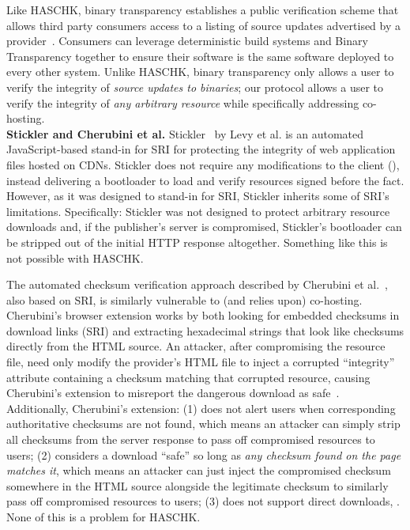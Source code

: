Like HASCHK, binary transparency establishes a public verification scheme
that allows third party consumers access to a listing of source updates
advertised by a provider~\cite{BinaryTransparency}. Consumers can leverage
deterministic build systems and Binary Transparency together to ensure their
software is the same software deployed to every other system. Unlike HASCHK,
binary transparency only allows a user to verify the integrity of \emph{source
updates to binaries}; our protocol allows a user to verify the integrity of
\emph{any arbitrary resource} while specifically addressing co-hosting. \\

\noindent\textbf{Stickler and Cherubini et al.} Stickler~\cite{Stickler} by Levy
et al. is an automated JavaScript-based stand-in for SRI for protecting the
integrity of web application files hosted on CDNs. Stickler does not require any
modifications to the client (), instead delivering a bootloader
to load and verify resources signed before the fact. However, as it was designed
to stand-in for SRI, Stickler inherits some of SRI's limitations. Specifically:
Stickler was not designed to protect arbitrary resource downloads and, if the
publisher's server is compromised, Stickler's bootloader can be stripped out of
the initial HTTP response altogether. Something like this is not possible with
HASCHK.

The automated checksum verification approach described by Cherubini et
al.~\cite{Cherubini}, also based on SRI, is similarly vulnerable to (and relies
upon) co-hosting. Cherubini's browser extension works by both looking for
embedded checksums in download links (SRI) and extracting hexadecimal strings
that look like checksums directly from the HTML source. An attacker, after
compromising the resource file, need only modify the provider's HTML file to
inject a corrupted ``integrity'' attribute containing a checksum matching that
corrupted resource, causing Cherubini's extension to misreport the dangerous
download as safe~\cite{Cherubini}. Additionally, Cherubini's extension: (1) does
not alert users when corresponding authoritative checksums are not found, which
means an attacker can simply strip all checksums from the server response to
pass off compromised resources to users; (2) considers a download ``safe'' so
long as \emph{any checksum found on the page matches it}, which means an
attacker can just inject the compromised checksum somewhere in the HTML source
alongside the legitimate checksum to similarly pass off compromised resources to
users; (3) does not support direct downloads, . None of
this is a problem for HASCHK.
